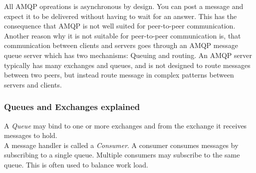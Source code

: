All AMQP opreations is asynchronous by design. You can post a message and expect it to be delivered without having to wait for an answer. This has the consequence that AMQP is not well suited for peer-to-peer communication. Another reason why it is not suitable for peer-to-peer communication is, that communication between clients and servers goes through an AMQP message queue server which has two mechanisms: Queuing and routing. An AMQP server typically has many exchanges and queues, and is not designed to route messages between two peers, but instead route message in complex patterns between servers and clients.
\subsubsection{Queues and Exchanges explained}
A \textit{Queue} may bind to one or more exchanges and from the exchange it receives messages to hold.\\
A message handler is called a \textit{Consumer}. A consumer consumes messages by subscribing to a single queue. Multiple consumers may subscribe to the same queue. This is often used to balance work load.

